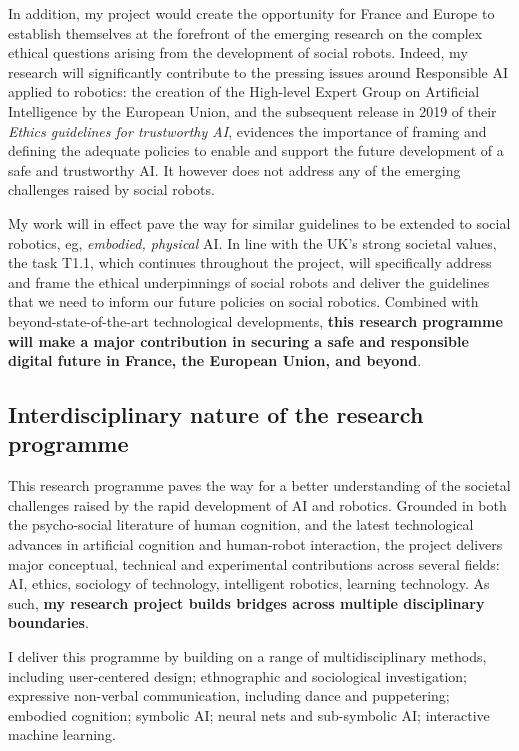 In addition, my project would create the opportunity for France and Europe to establish
themselves at the forefront of the emerging research on the complex ethical
questions arising from the development of social robots. Indeed, my research
will significantly contribute to the pressing issues around Responsible AI
applied to robotics: the creation of the High-level Expert Group on Artificial
Intelligence by the European Union, and the subsequent release in 2019 of their
\emph{Ethics guidelines for trustworthy AI}, evidences the importance of framing
and defining the adequate policies to enable and support the future development
of a safe and trustworthy AI. It however does not address any of the emerging
challenges raised by social robots.

My work will in effect pave the way for similar guidelines to be extended to
social robotics, eg, \emph{embodied, physical} AI. In line with the UK's strong
societal values, the task T1.1, which continues throughout the project, will
specifically address and frame the ethical underpinnings of social robots
and deliver the guidelines that we need to inform our future policies on social
robotics. Combined with beyond-state-of-the-art technological developments,
\textbf{this research programme will make a major contribution in
securing a safe and responsible digital future in France, the European Union, and beyond}. 


\subsection{Interdisciplinary nature of the research programme}

This research programme paves the way for a better understanding of the societal challenges
raised by the rapid development of AI and robotics. Grounded in both the
psycho-social literature of human cognition, and the latest technological
advances in artificial cognition and human-robot interaction, the project
delivers major conceptual, technical and experimental contributions across
several fields: AI, ethics, sociology of technology, intelligent robotics,
learning technology. As such, \textbf{my research project builds bridges across
multiple disciplinary boundaries}.

I deliver this programme by building on a range of multidisciplinary
methods, including user-centered design; ethnographic and sociological
investigation; expressive non-verbal communication, including dance and
puppetering; embodied cognition; symbolic AI; neural
nets and sub-symbolic AI; interactive machine learning.


